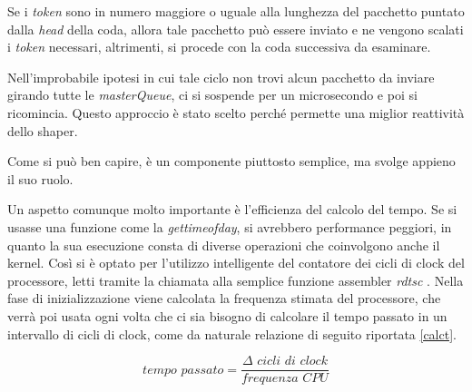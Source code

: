 Se i \emph{token} sono in numero maggiore o uguale alla lunghezza del pacchetto puntato dalla \emph{head} della coda, allora tale pacchetto può essere inviato e ne vengono scalati i \emph{token} necessari, altrimenti, si procede con la coda successiva da esaminare.

Nell'improbabile ipotesi in cui tale ciclo non trovi alcun pacchetto da inviare girando tutte le \emph{masterQueue}, ci si sospende per un microsecondo e poi si ricomincia. Questo approccio è stato scelto perché permette una miglior reattività dello shaper.

Come si può ben capire, è un componente piuttosto semplice, ma svolge appieno il suo ruolo.

Un aspetto comunque molto importante è l'efficienza del calcolo del tempo. Se si usasse una funzione come la \emph{gettimeofday}, si avrebbero performance peggiori, in quanto la sua esecuzione consta di diverse operazioni che coinvolgono anche il kernel. Così si è optato per l'utilizzo intelligente del contatore dei cicli di clock del processore, letti tramite la chiamata alla semplice funzione assembler \emph{rdtsc} \cite{rdtsc}. Nella fase di inizializzazione viene calcolata la frequenza stimata del processore, che verrà poi usata ogni volta che ci sia bisogno di calcolare il tempo passato in un intervallo di cicli di clock, come da naturale relazione di seguito riportata \eqref{calct}.

\begin{equation}\label{calct}
\textit{tempo passato} = \frac{\Delta\textit{ cicli di clock}}{\textit{frequenza CPU}}
\end{equation}

\clearpage
